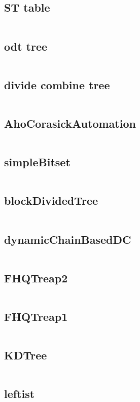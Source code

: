 \subsection{ST table}
  \inputminted{cpp}{../code/data_structure/ST_table.cpp}
\subsection{odt tree}
  \inputminted{cpp}{../code/data_structure/odt_tree.cpp}
\subsection{divide combine tree}
  \inputminted{cpp}{../code/data_structure/divide_combine_tree.cpp}
\subsection{AhoCorasickAutomation}
  \inputminted{cpp}{../code/data_structure/AhoCorasickAutomation.cpp}
\subsection{simpleBitset}
  \inputminted{cpp}{../code/data_structure/simpleBitset.cpp}
\subsection{blockDividedTree}
  \inputminted{cpp}{../code/data_structure/blockDividedTree.cpp}
\subsection{dynamicChainBasedDC}
  \inputminted{cpp}{../code/data_structure/dynamicChainBasedDC.cpp}
\subsection{FHQTreap2}
  \inputminted{cpp}{../code/data_structure/FHQTreap2.cpp}
\subsection{FHQTreap1}
  \inputminted{cpp}{../code/data_structure/FHQTreap1.cpp}
\subsection{KDTree}
  \inputminted{cpp}{../code/data_structure/KDTree.cpp}
\subsection{leftist}
  \inputminted{cpp}{../code/data_structure/leftist.cpp}
